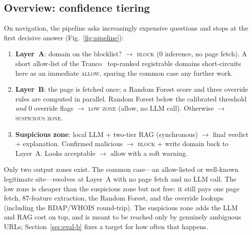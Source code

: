 \documentclass[conference]{IEEEtran}
\begin{document}
\subsection{Overview: confidence tiering}
\label{sec:arch-overview}
On navigation, the pipeline asks increasingly expensive questions and stops at
the first decisive answer (Fig.~\ref{fig:pipeline}):
\begin{enumerate}
\item \textbf{Layer~A}: domain on the blocklist? $\rightarrow$ \textsc{block}
(0 inference, no page fetch). A short allow-list of the Tranco~\cite{lepochat2019tranco}
top-ranked registrable domains short-circuits here as an immediate \textsc{allow},
sparing the common case any further work.
\item \textbf{Layer~B}: the page is fetched once; a Random Forest score and three
override rules are computed in parallel. Random Forest below the calibrated
threshold \emph{and} 0 override flags $\rightarrow$ \textsc{low zone} (allow, no
LLM call). Otherwise $\rightarrow$ \textsc{suspicious zone}.
\item \textbf{Suspicious zone}: local LLM + two-tier RAG (synchronous)
$\rightarrow$ final verdict + explanation. Confirmed malicious $\rightarrow$
\textsc{block} + write domain back to Layer~A. Looks acceptable $\rightarrow$
allow with a soft warning.
\end{enumerate}
Only two output zones exist. The common case---an allow-listed or well-known
legitimate site---resolves at Layer~A with no page fetch and no LLM call. The low
zone is cheaper than the suspicious zone but not free: it still pays one page
fetch, 87-feature extraction, the Random Forest, and the override lookups
(including the RDAP/WHOIS round-trip). The suspicious zone adds the LLM and RAG
cost on top, and is meant to be reached only by genuinely ambiguous URLs;
Section~\ref{sec:eval-b} fixes a target for how often that happens.
\end{document}

